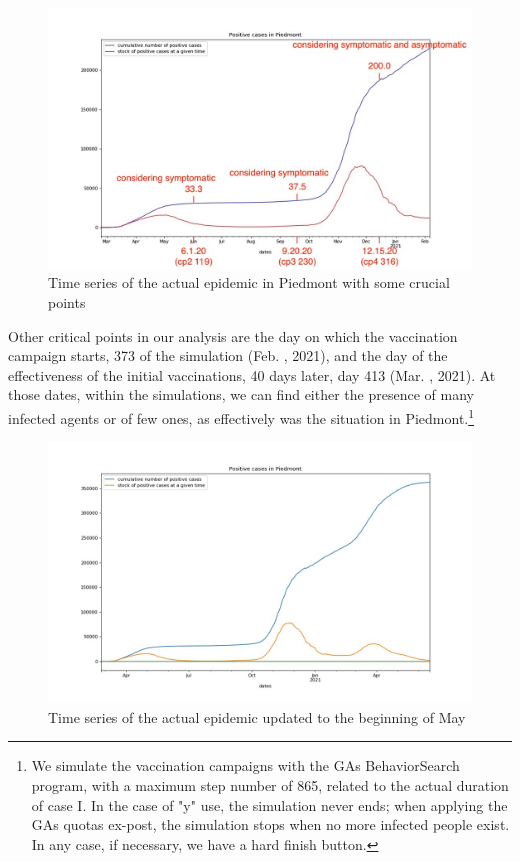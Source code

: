 \documentclass[graybox]{svmult}
\begin{document}
\begin{figure}[t]
\center
\includegraphics[scale=0.3]{andamento900annotato.jpg}

\caption{Time series of the actual epidemic in Piedmont with some crucial points} 
\label{piedIni}
\end{figure}


Other critical points in our analysis are the day on which the vaccination campaign starts, 373 of the simulation (Feb. , 2021), and the day of the effectiveness of the initial vaccinations, 40 days later, day 413 (Mar. , 2021). At those dates, within the simulations, we can find either the presence of many infected agents or of few ones, as effectively was the situation in Piedmont.\footnote{We simulate the vaccination campaigns with the GAs BehaviorSearch program, with a maximum step number of 865, related to the actual duration of case I. In the case of "y" use, the simulation never ends; when applying the GAs quotas ex-post, the simulation stops when no more infected people exist. In any case, if necessary, we have a hard finish button.}



\begin{figure}[t]
\center
\includegraphics[scale=0.3]{andamento900.jpg}

\caption{Time series of the actual epidemic updated to the beginning of May} 
\label{piedNow}
\end{figure}
\end{document}
